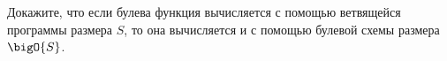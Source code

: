 Докажите, что если булева функция вычисляется с помощью ветвящейся программы размера $S$, то она
вычисляется и с помощью булевой схемы размера $\bigO{S}$.
